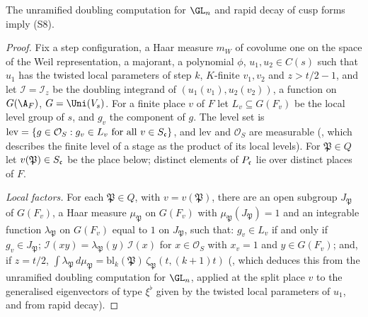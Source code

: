 \begin{lemma}\label{pf:bundles:lem:S8}
The unramified doubling computation for $\GL_n$ and rapid decay of cusp forms imply (S8).
\end{lemma}

\begin{proof}
Fix a step configuration, a Haar measure $m_W$ of covolume one on the space of the Weil representation, a majorant, a polynomial $\phi$, $u_1,u_2\in C(s)$ such that $u_1$ has the twisted
local parameters of step $k$, $K$-finite $v_1,v_2$ and $z>t/2-1$, and let $\mathcal I=\mathcal I_z$ be the doubling integrand of
$(u_1(v_1),u_2(v_2))$, a function on $G(\A_F)$, $G=\Uni(V_s)$. For a finite place $v$ of $F$ let $L_v\subseteq G(F_v)$ be the local level group of
$s$, and $g_v$ the component of $g$. The level set is $\mathrm{lev}=\{g\in\mathcal O_S:g_v\in L_v\text{ for all }v\in S_\mathfrak c\}$, and
$\mathrm{lev}$ and $\mathcal O_S$ are measurable (, which describes
the finite level of a stage as the product of its local levels). For $\mathfrak P\in Q$ let $v(\mathfrak P)\in S_\mathfrak c$ be the place below;
distinct elements of $P_\mathfrak c$ lie over distinct places of $F$.

\emph{Local factors.} For each $\mathfrak P\in Q$, with $v=v(\mathfrak P)$, there are an open subgroup $J_{\mathfrak P}$ of $G(F_v)$, a Haar
measure $\mu_{\mathfrak P}$ on $G(F_v)$ with $\mu_{\mathfrak P}(J_{\mathfrak P})=1$ and an integrable function $\lambda_{\mathfrak P}$ on $G(F_v)$
equal to $1$ on $J_{\mathfrak P}$, such that: $g_v\in L_v$ if and only if $g_v\in J_{\mathfrak P}$; $\mathcal I(xy)=\lambda_{\mathfrak P}(y)\,
\mathcal I(x)$ for $x\in\mathcal O_S$ with $x_v=1$ and $y\in G(F_v)$; and, if $z=t/2$, $\int\lambda_{\mathfrak P}\,d\mu_{\mathfrak P}=
\mathrm{bl}_k(\mathfrak P)\,\zeta_{\mathfrak P}(t,(k+1)t)$ (, which
deduces this from the unramified doubling computation for $\GL_n$, applied at the split place $v$ to the generalised eigenvectors of type
$\xi^\flat$ given by the twisted local parameters of $u_1$, and from rapid decay).


\end{proof}
